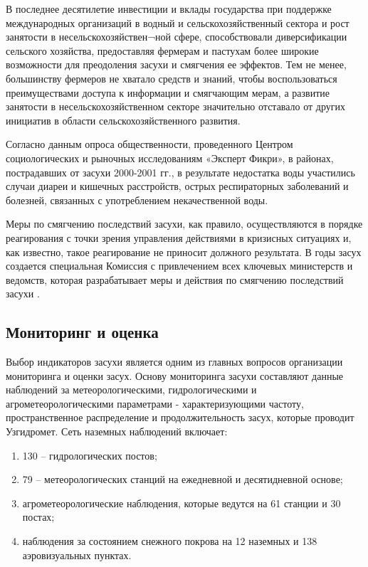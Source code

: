 В последнее десятилетие инвестиции и вклады государства при поддержке международных организаций в водный и сельскохозяйственный сектора и рост занятости в несельскохозяйствен¬ной сфере, способствовали диверсификации сельского хозяйства, предоставляя фермерам и пастухам более широкие возможности для преодоления засухи и смягчения ее эффектов. Тем не менее, большинству фермеров не хватало средств и знаний, чтобы воспользоваться преимуществами доступа к информации и смягчающим мерам, а развитие занятости в несельскохозяйственном секторе значительно отставало от других инициатив в области сельскохозяйственного развития.

Согласно данным опроса общественности, проведенного Центром социологических и рыночных исследованиям «Эксперт Фикри», в районах, пострадавших от засухи 2000-2001 гг., в результате недостатка воды участились случаи диареи и кишечных расстройств, острых респираторных заболеваний и болезней, связанных с употреблением некачественной воды. 

Меры по смягчению последствий засухи, как правило, осуществляются в порядке реагирования с точки зрения управления действиями в кризисных ситуациях и, как известно, такое реагирование не приносит должного результата. В годы засух создается специальная Комиссия с привлечением всех ключевых министерств и ведомств, которая разрабатывает меры и действия по смягчению последствий засухи \cite{Zasuha2013}. 

\subsection{Мониторинг и оценка}
Выбор индикаторов засухи является одним из главных вопросов организации мониторинга и оценки засух. 
Основу мониторинга засухи составляют данные наблюдений за метеорологическими, гидрологическими и агрометеорологическими параметрами - характеризующими частоту, пространственное распределение и продолжительность засух, которые проводит Узгидромет. 
Сеть наземных наблюдений включает: 
\begin{enumerate}
	\item 130 – гидрологических постов; 
	\item 79 – метеорологических станций на ежедневной и десятидневной основе; 
	\item агрометеорологические наблюдения, которые ведутся на 61 станции и 30 постах; 
	\item наблюдения за состоянием снежного покрова на 12 наземных и 138 аэровизуальных пунктах. 
\end{enumerate}

